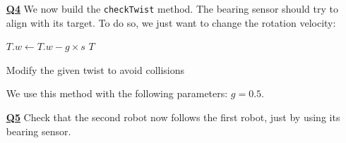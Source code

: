 \documentclass{ecnreport}
\begin{document}
\begin{itemize}
\medskip\item[\textbf{\underline{Q4}}] We now build the \texttt{checkTwist} method. The bearing sensor should try to align with its target. To do so, we just want to change the rotation velocity:
\begin{algorithm}[!h]
{}
$T.w \gets T.w - g\times s$\;
\Return $T$
\caption{Modify the given twist to avoid collisions}
\label{algo:bearing}
\end{algorithm}

We use this method with the following parameters: $g = 0.5$.


\medskip\item[\textbf{\underline{Q5}}] Check that the second robot now follows the first robot, just by using its bearing sensor. 

\end{itemize}
\end{document}
